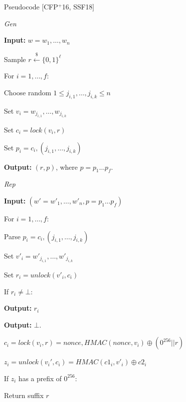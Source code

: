 \documentclass{beamer}
\newcommand{\gen}{\textit{Gen}\xspace}
\newcommand{\rep}{\textit{Rep}\xspace}
\newcommand{\lock}{\textit{lock}\xspace}
\newcommand{\unlock}{\textit{unlock}\xspace}
\begin{document}
\begin{frame}{Pseudocode [CFP$^+$16, SSF18]}
    \begin{multicols}{2}
\gen

\textbf{Input:} $w = w_1,\dots,w_n$ 

Sample $r \xleftarrow{\$} \{0,1\}^\ell$

For $i = 1,\dots, f$:

        \quad Choose random $1 \leq j_{i,1},\dots, j_{i,k} \leq n$
        
        \quad Set $v_i = w_{j_{i,1}},\dots, w_{j_{i,k}}$ 
        
        \quad Set $c_i = \lock(v_i, r)$
        
        \quad Set $p_i = c_i, (j_{i,1},\dots, j_{i,k})$

\textbf{Output:} $(r,p)$, where $p = p_1 \dots p_f$.

\columnbreak
\rep

\textbf{Input:} $(w' = w'_1,\dots,w'_n, p = p_1 \dots p_f)$ 

For $i = 1,\dots, f$:

        \quad Parse $p_i = c_i, (j_{i,1},\dots, j_{i,k})$
        
        \quad Set $v'_i = w'_{j_{i,1}},\dots, w'_{j_{i,k}}$ 
        
        \quad Set $r_i = \unlock(v'_i, c_i)$
        
        \quad If $r_i \neq \bot$:
        
        \qquad\textbf{Output:}  $r_i$

\textbf{Output:} $\bot$.

\end{multicols}\pause
\begin{multicols}{2}
\small
$c_i = \lock(v_i,r) = nonce, HMAC(nonce, v_i) \oplus (0^{256}||r)$
\columnbreak

$z_i = \unlock(v_i',c_i) = HMAC(c1_i, v'_i) \oplus c2_i$ 

If $z_i$ has a prefix of $0^{256}$:

    \quad Return suffix $r$
\end{multicols}
\end{frame}
\end{document}
